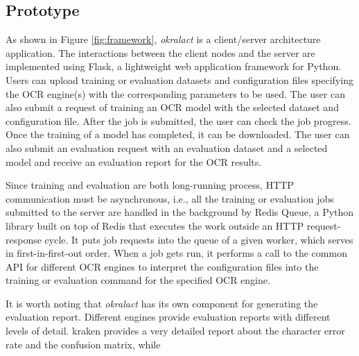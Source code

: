 \documentclass[conference]{IEEEtran}
\begin{document}
\subsection{Prototype}
\label{sec:prototype}

As shown in Figure \ref{fig:framework}, \textit{okralact} is a client/server
architecture application. The interactions between the client nodes and the
server are implemented using Flask, a lightweight web application framework for Python.
Users can upload training or evaluation datasets and configuration files
specifying the OCR engine(s) with the corresponding parameters to be used. 
The user can also submit a request of training an OCR model with the selected 
dataset and configuration file. After the job is submitted, the user can check the job
progress. Once the training of a model has completed, it can be downloaded.
The user can also submit an evaluation request with an evaluation dataset and
a selected model and receive an evaluation report for the OCR results. 



Since training and evaluation are both long-running process, HTTP communication must be asynchronous,
i.e., all the training or evaluation
jobs submitted to the server are handled in the background by Redis Queue,
a Python library built on top of Redis that
executes the work outside an HTTP request-response cycle. It puts job
requests into the queue of a given worker, which serves in
first-in-first-out order. When a job gets run, it performs a call to the common
API for different OCR engines to interpret the configuration files into the
training or evaluation command for the specified OCR engine. 

It is worth noting that \textit{okralact} has its own component for generating the evaluation report. Different engines provide evaluation reports with different levels of detail. kraken provides a very detailed report about the character error rate and the confusion matrix, while  
\end{document}
